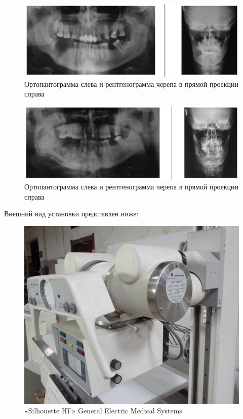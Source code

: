 \documentclass[11pt]{article}
\begin{document}
	\begin{figure}[H]
	\centering
	\includegraphics[width=\textwidth]{r2}
	\caption{Ортопантограмма слева и рентгенограмма черепа в прямой проекции справа }
	\label{fig:r2}
	\end{figure}

	\begin{figure}[H]
	\centering
	\includegraphics[width=\textwidth]{r3}
	\caption{Ортопантограмма слева и рентгенограмма черепа в прямой проекции справа }
	\label{fig:r3}
	\end{figure}

	Внешний вид установки представлен ниже:
	\begin{figure}[H]
		\centering
		\includegraphics[width=\textwidth]{hf}
		\caption{«Silhouette HF» General Electric Medical Systems}
		\label{fig:hf}
	\end{figure}
\end{document}
